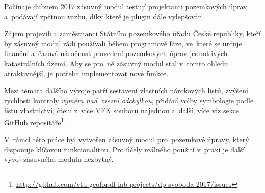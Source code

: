 Počínaje dubnem 2017 zásuvný modul testují projektanti pozemkových
úprav a~podávají zpětnou vazbu, díky které je plugin dále vylepšován.

Zájem projevili i~zaměstnanci Státního pozemkového úřadu České
republiky, kteří by zásuvný modul rádi používali během programové
fáze, ve~které se určuje finanční a~časová náročnost provedení
pozemkových úprav jednotlivých katastrálních území. Aby se pro~ně
zásuvný modul stal v~tomto ohledu atraktivnější, je potřeba
implementovat nové funkce.

Mezi témata dalšího vývoje patří sestavení vlastních nárokových listů,
zvýšení rychlosti kontroly \textit{výměra nad~mezní odchylkou},
přidání volby symbologie podle listu vlastnictví, čtení z~více VFK
souborů najednou a~další, více viz sekce GitHub
repositáře\footnote{\url{http://github.com/ctu-geoforall-lab-projects/dp-svoboda-2017/issues}}.

V~rámci této práce byl vytvořen zásuvný modul pro~pozemkové úpravy,
který disponuje klíčovou funkcionalitou. Pro účely reálného použití
v~praxi je další vývoj zásuvného modulu nezbytný.
